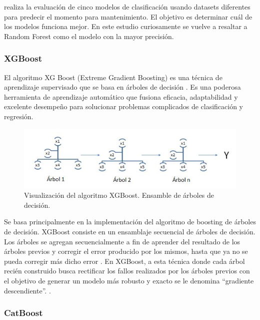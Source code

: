 \documentclass[11pt,a4paper,spanish]{book}
\numberwithin{equation}{chapter}
\numberwithin{figure}{chapter}
\begin{document}
\cite{sharma2022predictive} realiza la evaluación de cinco modelos de clasificación 
usando datasets diferentes para predecir el momento para mantenimiento. 
El objetivo es determinar cuál de los modelos funciona mejor. En este estudio 
curiosamente se vuelve a resaltar a Random Forest como el modelo con la mayor precisión.


\subsubsection{XGBoost}

El algoritmo XG Boost (Extreme Gradient Boosting) es una técnica de aprendizaje 
supervisado que se basa en árboles de decisión \cite{chen2016xgboost}. 
Es una poderosa herramienta de aprendizaje automático que fusiona eficacia, 
adaptabilidad y excelente desempeño para solucionar problemas complicados de 
clasificación y regresión. 

\begin{figure}[h]
    \centering
    \includegraphics[width=1.0\textwidth]{media/xgboost-salman.png}
    \caption{Visualización del algoritmo XGBoost. Ensamble de árboles de decisión. 
    \protect\cite{salman2024rf} }
    \label{fig:figXGBoostSalman}
\end{figure}


Se basa principalmente en la implementación del algoritmo de boosting de árboles de 
decisión. XGBoost consiste en un ensamblaje secuencial de árboles de decisión. 
Los árboles se agregan secuencialmente a fin de aprender del resultado de los árboles 
previos y corregir el error producido por los mismos, hasta que ya no se pueda corregir 
más dicho error \cite{salman2024rf}.  En XGBoost, a esta técnica donde cada árbol recién 
construido busca rectificar los fallos realizados por los árboles previos con el 
objetivo de generar un modelo más robusto y exacto se le denomina “gradiente 
descendiente”. \cite{espinoza2020rf_xgboost}.


\subsubsection{CatBoost}
\end{document}
